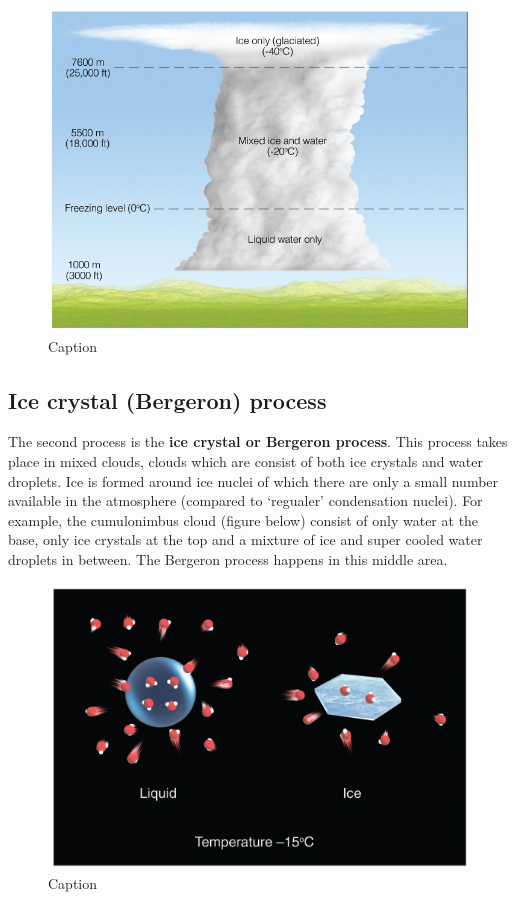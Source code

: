 \documentclass[12pt,oneside]{book}
\begin{document}
\begin{figure}

{\centering \includegraphics[width=0.9\linewidth]{figures/Figure328} 

}

\caption{Caption}\label{fig:Collision2}
\end{figure}

\subsection{Ice crystal (Bergeron)
process}\label{ice-crystal-bergeron-process}

The second process is the \textbf{ice crystal or Bergeron process}. This
process takes place in mixed clouds, clouds which are consist of both
ice crystals and water droplets. Ice is formed around ice nuclei of
which there are only a small number available in the atmosphere
(compared to `regualer' condensation nuclei). For example, the
cumulonimbus cloud (figure below) consist of only water at the base,
only ice crystals at the top and a mixture of ice and super cooled water
droplets in between. The Bergeron process happens in this middle area.

\begin{figure}

{\centering \includegraphics[width=0.9\linewidth]{figures/Figure329} 

}

\caption{Caption}\label{fig:Bergeron}
\end{figure}
\end{document}
